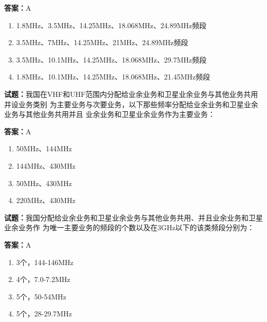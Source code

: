 \documentclass{ctexbook}
\begin{document}
\textbf{答案：}A 

\begin{enumerate}[leftmargin=3em]
  \item 1.8MHz、3.5MHz、14.25MHz、18.068MHz、24.89MHz频段 

  \item 3.5MHz、7MHz、14.25MHz、21MHz、24.89MHz频段 

  \item 3.5MHz、10.1MHz、14.25MHz、18.068MHz、29.7MHz频段 

  \item 1.8MHz、10.1MHz、14.25MHz、18.068MHz、21.45MHz频段 

\end{enumerate}






\vspace{1em}

\textbf{试题：}我国在VHF和UHF范围内分配给业余业务和卫星业余业务与其他业务共用并设业务类别
为主要业务与次要业务，以下那些频率分配给业余业务和卫星业余业务与其他业务共用并且
业余业务和卫星业余业务作为主要业务： 

\textbf{答案：}A 

\begin{enumerate}[leftmargin=3em]
  \item 50MHz、144MHz 

  \item 144MHz、430MHz 

  \item 50MHz、430MHz 

  \item 220MHz、430MHz 

\end{enumerate}





\vspace{1em}

\textbf{试题：}我国分配给业余业务和卫星业余业务与其他业务共用、并且业余业务和卫星业余业务作
为唯一主要业务的频段的个数以及在3GHz以下的该类频段分别为： 

\textbf{答案：}A 

\begin{enumerate}[leftmargin=3em]
  \item 3个，144-146MHz 

  \item 4个，7.0-7.2MHz 

  \item 5个，50-54MHz 

  \item 5个，28-29.7MHz 

\end{enumerate}
\end{document}
